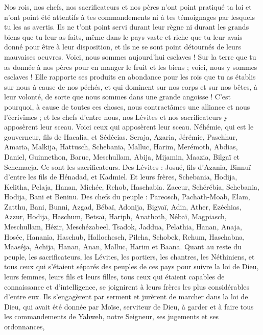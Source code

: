 \begin{multicols}{2}
Nos rois, nos chefs, nos sacrificateurs et nos pères n'ont point pratiqué ta loi et n'ont point été attentifs à tes commandements ni à tes témoignages par lesquels tu les as avertis.
Ils ne t'ont point servi durant leur règne ni durant les grands biens que tu leur as faits, même dans le pays vaste et riche que tu leur avais donné pour être à leur disposition, et ils ne se sont point détournés de leurs mauvaises oeuvres.
Voici, nous sommes aujourd'hui esclaves ! Sur la terre que tu as donnée à nos pères pour en manger le fruit et les biens ; voici, nous y sommes esclaves !
Elle rapporte ses produits en abondance pour les rois que tu as établis sur nous à cause de nos péchés, et qui dominent sur nos corps et sur nos bêtes, à leur volonté, de sorte que nous sommes dans une grande angoisse !
C'est pourquoi, à cause de toutes ces choses, nous contractâmes une alliance et nous l'écrivîmes ; et les chefs d'entre nous, nos Lévites et nos sacrificateurs y apposèrent leur sceau.
\VerseOne{}Voici ceux qui apposèrent leur sceau. Néhémie, qui est le gouverneur, fils de Hacalia, et Sédécias.
Seraja, Azaria, Jérémie,
Paschhur, Amaria, Malkija,
Hattusch, Schebania, Malluc,
Harim, Merémoth, Abdias,
Daniel, Guinnethon, Baruc,
Meschullam, Abija, Mijamin,
Maazia, Bilgaï et Schemaeja. Ce sont les sacrificateurs.
Des Lévites : Josué, fils d'Azania, Binnuï d'entre les fils de Hénadad, et Kadmiel.
Et leurs frères, Schebania, Hodija, Kelitha, Pelaja, Hanan,
Michée, Rehob, Haschabia.
Zaccur, Schérébia, Schebania,
Hodija, Bani et Beninu.
Des chefs du peuple : Pareosch, Pachath-Moab, Elam, Zatthu, Bani,
Bunni, Azgad, Bébaï,
Adonija, Bigvaï, Adin,
Ather, Ezéchias, Azzur,
Hodija, Haschum, Betsaï,
Hariph, Anathoth, Nébaï,
Magpiasch, Meschullam, Hézir,
Meschézabeel, Tsadok, Jaddua,
Pelathia, Hanan, Anaja,
Hosée, Hanania, Haschub,
Hallochesch, Pilcha, Schobek,
Rehum, Haschabna, Maaséja,
Achija, Hanan, Anan,
Malluc, Harim et Baana.
Quant au reste du peuple, les sacrificateurs, les Lévites, les portiers, les chantres, les Néthiniens, et tous ceux qui s'étaient séparés des peuples de ces pays pour suivre la loi de Dieu, leurs femmes, leurs fils et leurs filles, tous ceux qui étaient capables de connaissance et d'intelligence,
se joignirent à leurs frères les plus considérables d'entre eux. Ils s'engagèrent par serment et jurèrent de marcher dans la loi de Dieu, qui avait été donnée par Moïse, serviteur de Dieu, à garder et à faire tous les commandements de Yahweh, notre Seigneur, ses jugements et ses ordonnances,

\end{multicols}
